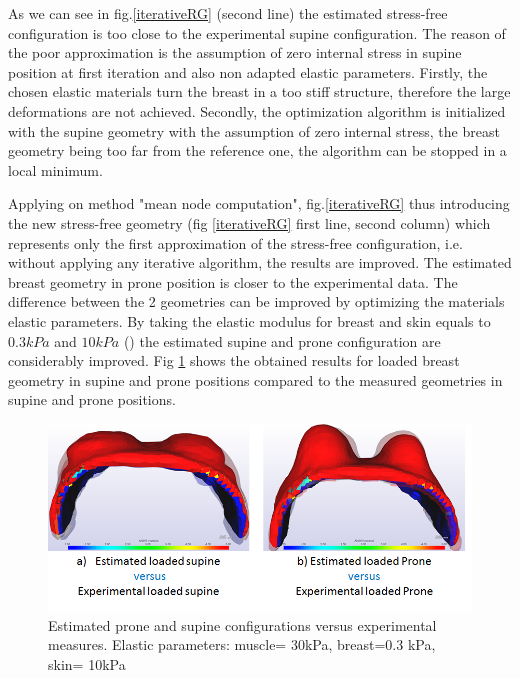 As we can see in fig.\ref{iterativeRG} (second line) the estimated stress-free configuration is too close to the experimental supine configuration. The reason of the poor approximation is the assumption of zero internal stress in supine position at first iteration and also non adapted elastic parameters. Firstly, the chosen elastic materials turn the breast in a too stiff structure, therefore the large deformations are not achieved. Secondly, the optimization algorithm is initialized with the supine geometry with the assumption of zero internal stress, the breast geometry being too far from the reference one, the algorithm can be stopped in a local minimum.   

Applying on method "mean node computation", fig.\ref{iterativeRG} thus introducing the new stress-free geometry (fig \ref{iterativeRG} first line, second column) which represents only the first approximation of the stress-free configuration, i.e. without applying any iterative algorithm, the results are improved. The estimated breast geometry in prone position is closer to the experimental data. The difference between the 2 geometries can be improved by optimizing the materials elastic parameters. By taking the elastic modulus for breast and skin equals to $0.3 kPa$ and $10kPa$ (\cite{carter_determining_2009}) the estimated supine and prone configuration are considerably improved. Fig \ref{optimizedParam} shows the obtained results for loaded breast geometry in supine and prone positions compared to the measured geometries in supine and prone positions.  

\begin{center}			  
\begin{figure}[h]
\centerline{\includegraphics[scale=0.8]{figures/estimated_PS_Mesn_3e-1.png} }
\caption{Estimated prone and supine configurations versus experimental measures. Elastic parameters: muscle= 30kPa, breast=0.3 kPa, skin= 10kPa }
\label{optimizedParam}
\end{figure}
\end{center}
